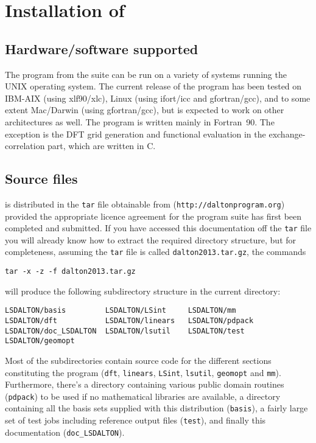 \chapter{Installation of \lsdalton}\label{ch:install}

\section{Hardware/software
supported}\label{sec:hardsoft}

The {\lsdalton} program from the {\latestrelease} suite
can be run on a variety of systems running the UNIX
operating system. The current release of the program 
has been tested on 
IBM-AIX (using xlf90/xlc),
Linux (using ifort/icc and gfortran/gcc), 
and to some extent Mac/Darwin (using gfortran/gcc), but is
expected to work on other architectures as well. 
The program is written mainly in Fortran~90.
The exception is the DFT grid generation and functional evaluation in the 
exchange-correlation part, which are written in C.

\section{Source files}\label{sec:source}

{\lsdalton} is distributed in the {\latestrelease} \verb|tar| file obtainable from
(\verb|http://daltonprogram.org|) provided the appropriate
licence agreement for the {\latestrelease} program suite has first been
completed and submitted.
If you have accessed this documentation off the
\verb|tar| file you will
already know how to extract the required directory structure, but
for completeness, assuming the \verb|tar| file is called
\verb|dalton2013.tar.gz|, the commands
\begin{verbatim}
tar -x -z -f dalton2013.tar.gz
\end{verbatim}
will produce the following subdirectory structure in the current
directory:
\begin{verbatim}
LSDALTON/basis         LSDALTON/LSint     LSDALTON/mm
LSDALTON/dft           LSDALTON/linears   LSDALTON/pdpack               
LSDALTON/doc_LSDALTON  LSDALTON/lsutil    LSDALTON/test            
LSDALTON/geomopt
\end{verbatim}
Most of the subdirectories contain source code for the different sections
constituting the {\lsdalton} program (\verb|dft|, \verb|linears|, 
\verb|LSint|, \verb|lsutil|, \verb|geomopt| and \verb|mm|). Furthermore,
there's a directory containing
various public domain routines (\verb|pdpack|) to be used if no 
mathematical libraries are available, a directory containing
all the basis sets supplied with this distribution (\verb|basis|), a
fairly large set of test jobs including reference output files
(\verb|test|), and finally this documentation (\verb|doc_LSDALTON|). 

